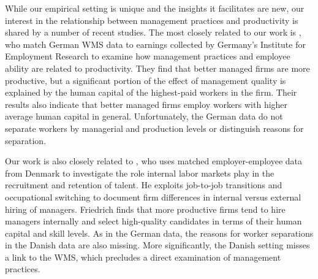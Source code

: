 
While our empirical setting is unique and the insights it facilitates are new, our interest in the relationship between management practices and productivity is shared by a number of recent studies. The most closely related to our work is 
\citet{Bender:Management:NBER:2016}, who match German WMS data to earnings collected by Germany's Institute for Employment Research to examine how management practices and employee ability are related to productivity. They find that better managed firms are more productive, but a significant portion of the effect of management quality is explained by the human capital of the highest-paid workers in the firm. Their results also indicate that better managed firms employ workers with higher average human capital in general. Unfortunately, the German data do not separate workers by managerial and production levels or distinguish reasons for separation.

Our work is also closely related to \citep{Friedrich2017}, %
who uses matched employer-employee data from Denmark to investigate the role internal labor markets play in the recruitment and retention of talent. He exploits job-to-job transitions and occupational switching to document firm differences in internal versus external hiring of managers. Friedrich finds that more productive firms tend to hire managers internally and select high-quality candidates in terms of their human capital and skill levels. As in the German data,  the reasons for worker separations in the Danish data are also missing. More significantly, the Danish setting misses a link to the WMS, which precludes a direct examination of management practices.   



